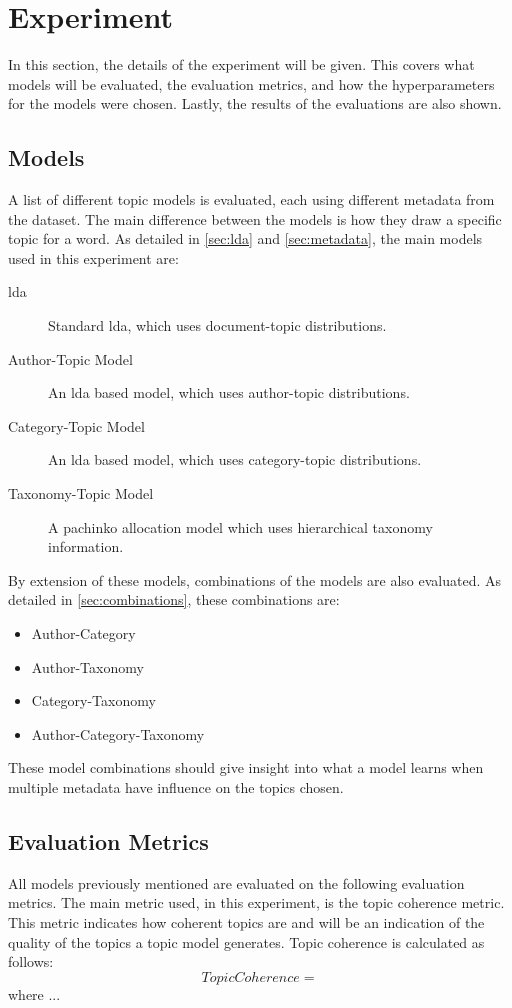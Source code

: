 \section{Experiment}\label{sec:experiment}
In this section, the details of the experiment will be given.
This covers what models will be evaluated, the evaluation metrics, and how the hyperparameters for the models were chosen.
Lastly, the results of the evaluations are also shown.

\subsection{Models}\label{sec:experiment_models}
A list of different topic models is evaluated, each using different metadata from the dataset.
The main difference between the models is how they draw a specific topic for a word.
As detailed in \autoref{sec:lda} and \autoref{sec:metadata}, the main models used in this experiment are:
\begin{description}
	\item[\Acrlong{lda}] Standard \gls{lda}, which uses document-topic distributions.
	\item[Author-Topic Model] An \gls{lda} based model, which uses author-topic distributions.
	\item[Category-Topic Model] An \gls{lda} based model, which uses category-topic distributions.
	\item[Taxonomy-Topic Model] A pachinko allocation model which uses hierarchical taxonomy information.
\end{description}

By extension of these models, combinations of the models are also evaluated.
As detailed in \autoref{sec:combinations}, these combinations are:
\begin{itemize}
	\item Author-Category
	\item Author-Taxonomy
	\item Category-Taxonomy
	\item Author-Category-Taxonomy
\end{itemize}
These model combinations should give insight into what a model learns when multiple metadata have influence on the topics chosen.

\subsection{Evaluation Metrics}\label{sec:experiment_metrics}
All models previously mentioned are evaluated on the following evaluation metrics.
The main metric used, in this experiment, is the topic coherence metric.
This metric indicates how coherent topics are and will be an indication of the quality of the topics a topic model generates.
Topic coherence is calculated as follows:
\begin{equation}
	TopicCoherence = 
\end{equation}
\noindent where ...

